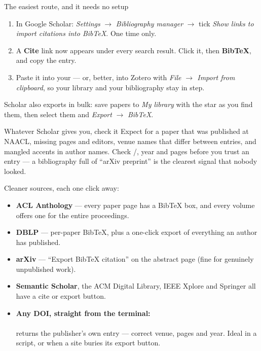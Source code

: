 \documentclass[11pt,a4paper]{article}
\begin{document}
\begin{cbox}{The easiest route, and it needs no setup}
\begin{enumerate}
  \item In Google Scholar: \emph{Settings} $\rightarrow$ \emph{Bibliography
        manager} $\rightarrow$ tick \emph{Show links to import citations into
        BibTeX}. One time only.
  \item A \textbf{Cite} link now appears under every search result. Click it,
        then \textbf{BibTeX}, and copy the entry.
  \item Paste it into your  --- or, better, into Zotero with
        \emph{File $\rightarrow$ Import from clipboard}, so your library and
        your bibliography stay in step.
\end{enumerate}
Scholar also exports in bulk: save papers to \emph{My library} with the star
as you find them, then select them and \emph{Export} $\rightarrow$
\emph{BibTeX}.
\end{cbox}

\begin{wbox}{Whatever Scholar gives you, check it}
Expect  for a paper that was published
at NAACL, missing pages and editors, venue names that differ between entries,
and mangled accents in author names. Check /,
year and pages before you trust an entry --- a bibliography full of ``arXiv
preprint'' is the clearest signal that nobody looked.
\end{wbox}

Cleaner sources, each one click away:

\begin{itemize}
  \item \textbf{ACL Anthology} --- every paper page has a BibTeX box, and
        every volume offers one  for the entire proceedings.
  \item \textbf{DBLP} --- per-paper BibTeX, plus a one-click export of
        everything an author has published.
  \item \textbf{arXiv} --- ``Export BibTeX citation'' on the abstract page
        (fine for genuinely unpublished work).
  \item \textbf{Semantic Scholar}, the ACM Digital Library, IEEE Xplore and
        Springer all have a cite or export button.
  \item \textbf{Any DOI, straight from the terminal:}\\
        \\
        returns the publisher's own entry --- correct venue, pages and year.
        Ideal in a script, or when a site buries its export button.
\end{itemize}
\end{document}
